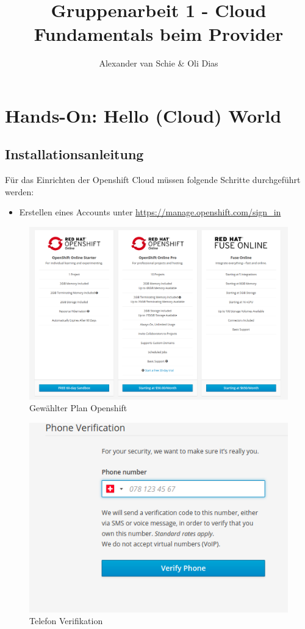 \documentclass[12pt,a4paper]{article}
\author{Alexander van Schie \& Oli Dias}
\title{Gruppenarbeit 1 - Cloud Fundamentals beim Provider}
\begin{document}
\maketitle
\newpage
\tableofcontents
\newpage
\section{Hands-On: Hello (Cloud) World}
\subsection{Installationsanleitung}
Für das Einrichten der Openshift Cloud müssen folgende Schritte durchgeführt werden:
\begin{itemize}
	\item Erstellen eines Accounts unter \url{https://manage.openshift.com/sign_in}
\end{itemize}
\begin{figure}[h]
	\centering
	\includegraphics[width=0.7\linewidth]{img/openshift-plan}
	\caption{Gewählter Plan Openshift}
	\label{fig:openshift-plan}
\end{figure}


\begin{figure}[h]
	\centering
	\includegraphics[width=0.7\linewidth]{img/os-phone-validation}
	\caption{Telefon Verifikation}
	\label{fig:os-phone-validation}
\end{figure}
\end{document}
